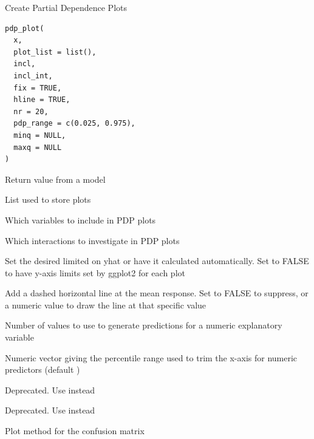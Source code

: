 \documentclass[a4paper]{book}
\begin{document}
%
\begin{Description}
Create Partial Dependence Plots
\end{Description}
%
\begin{Usage}
\begin{verbatim}
pdp_plot(
  x,
  plot_list = list(),
  incl,
  incl_int,
  fix = TRUE,
  hline = TRUE,
  nr = 20,
  pdp_range = c(0.025, 0.975),
  minq = NULL,
  maxq = NULL
)
\end{verbatim}
\end{Usage}
%
\begin{Arguments}
\begin{ldescription}
\item[\code{x}] Return value from a model

\item[\code{plot\_list}] List used to store plots

\item[\code{incl}] Which variables to include in PDP plots

\item[\code{incl\_int}] Which interactions to investigate in PDP plots

\item[\code{fix}] Set the desired limited on yhat or have it calculated automatically.
Set to FALSE to have y-axis limits set by ggplot2 for each plot

\item[\code{hline}] Add a dashed horizontal line at the mean response. Set to FALSE to suppress,
or a numeric value to draw the line at that specific value

\item[\code{nr}] Number of values to use to generate predictions for a numeric explanatory variable

\item[\code{pdp\_range}] Numeric vector  giving the percentile range used to trim the
x-axis for numeric predictors (default )

\item[\code{minq}] Deprecated. Use  instead

\item[\code{maxq}] Deprecated. Use  instead
\end{ldescription}
\end{Arguments}
%
\begin{Description}
Plot method for the confusion matrix
\end{Description}
\end{document}
